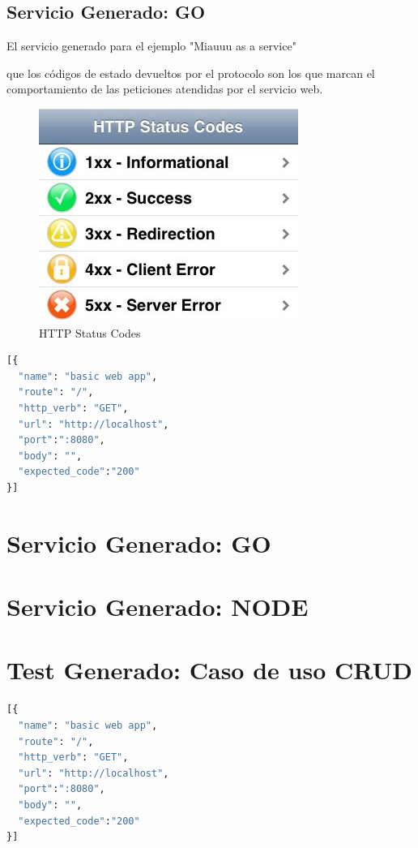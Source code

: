 \documentclass[a4paper,11pt]{book}
\begin{document}
\subsection{ Servicio Generado: GO}

El servicio generado para el ejemplo "Miauuu as a service"






que los códigos de estado devueltos por el protocolo son los que marcan el comportamiento de las peticiones atendidas por el servicio web. 

\begin{figure}[H]  
\centering 
\includegraphics[scale=0.35]{imagenes/http.jpg}
\caption{ HTTP Status Codes}  
\end{figure}


\begin{lstlisting}[language=python,caption={ Entrada Unitaria Configuración Generador }]
[{
  "name": "basic web app",
  "route": "/",
  "http_verb": "GET",
  "url": "http://localhost",
  "port":":8080",
  "body": "",
  "expected_code":"200"
}]
\end{lstlisting}


\section{Servicio Generado: GO}
\section{Servicio Generado: NODE}
\section{Test Generado: Caso de uso CRUD}

\begin{lstlisting}[language=python,caption={ Entrada Unitaria Configuración Generador }]
[{
  "name": "basic web app",
  "route": "/",
  "http_verb": "GET",
  "url": "http://localhost",
  "port":":8080",
  "body": "",
  "expected_code":"200"
}]

\end{lstlisting}
\end{document}
